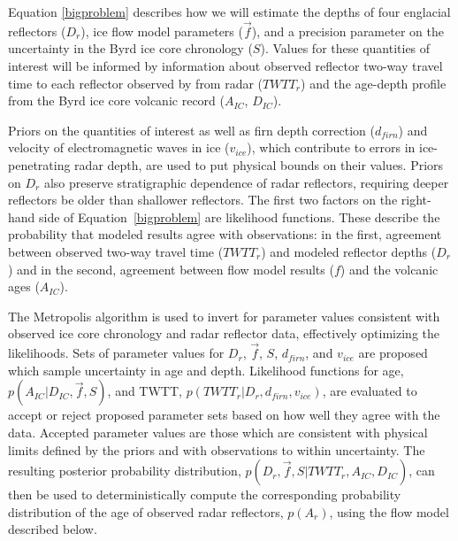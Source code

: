 Equation \ref{bigproblem} describes how we will estimate the depths of four englacial reflectors ($D_r$), ice flow model parameters ($\vec{f}$), and a precision parameter on the uncertainty in the Byrd ice core chronology ($S$). Values for these quantities of interest will be informed by  information about observed reflector two-way travel time to each reflector observed by from radar ($TWTT_r$) and the age-depth profile from the Byrd ice core volcanic record ($A_{IC}$, $D_{IC}$). 

Priors on the quantities of interest as well as firn depth correction ($d_{firn}$) and velocity of electromagnetic waves in ice ($v_{ice}$), which contribute to errors in ice-penetrating radar depth, are used to put physical bounds on their values. Priors on ${D_r}$ also preserve stratigraphic dependence of radar reflectors, requiring deeper reflectors be older than shallower reflectors. The first two factors on the right-hand side of Equation~\ref{bigproblem} are likelihood functions. These describe the probability that modeled results agree with observations: in the first, agreement between observed two-way travel time ($TWTT_r$) and modeled reflector depths ($D_r$) and in the second, agreement between flow model results ($f$) and the volcanic ages ($A_{IC}$). 

The Metropolis algorithm is used to invert for parameter values consistent with observed ice core chronology and radar reflector data, effectively optimizing the likelihoods. Sets of parameter values for $D_r$, $\vec{f}$, $S$, $d_{firn}$, and $v_{ice}$ are proposed which sample uncertainty in age and depth. %
Likelihood functions for age, $p(A_{IC} | D_{IC},\vec{f},S)$, and TWTT, $p(TWTT_r | D_r,d_{firn},v_{ice})$, are evaluated to accept or reject proposed parameter sets based on how well they agree with the data. Accepted parameter values are those which are consistent with physical limits defined by the priors and with observations to within uncertainty. The resulting posterior probability distribution, $p(D_r, \vec{f},S | TWTT_r, A_{IC}, D_{IC})$, can then be used to deterministically compute the corresponding probability distribution of the age of observed radar reflectors, $p(A_r)$, using the flow model described below.



\label{radardepth}

%



